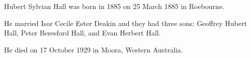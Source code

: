 
Hubert Sylvian Hall was born in 1885 on 25 March 1885 in Roebourne. 

He married Isor Cecile Ester Deakin and they had three sons: Geoffrey Hubert Hall, Peter Beresford Hall, and Evan Herbert Hall.

He died on 17 October 1929 in Moora, Western Australia.
